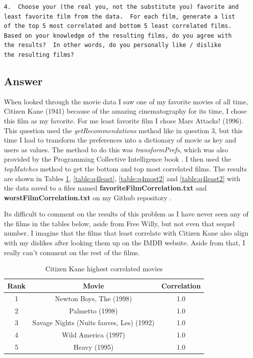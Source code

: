 \documentclass[letterpaper,11pt]{article}
\begin{document}
\begin{verbatim}
4.  Choose your (the real you, not the substitute you) favorite and
least favorite film from the data.  For each film, generate a list
of the top 5 most correlated and bottom 5 least correlated films.
Based on your knowledge of the resulting films, do you agree with
the results?  In other words, do you personally like / dislike
the resulting films?
\end{verbatim}

\subsection*{Answer}

When looked through the movie data I saw one of my favorite movies of all time, Citizen Kane (1941) because of the amazing cinematography for its time, I chose this film as my favorite. For me least favorite film I chose Mars Attacks! (1996). This question used the \textit{getRecommendations} method like in question 3, but this time I had to transform the preferences into a dictionary of movie as key and users as values. The method to do this was \textit{transformPrefs}, which was also provided by the Programming Collective Intelligence book \cite{collectiveIntell}. I then used the \textit{topMatches} method to get the bottom and top most correlated films. The results are shown in Tables \ref{table:q4most}, \ref{table:q4least}, \ref{table:q4most2} and \ref{table:q4least2} with the data saved to a files named \textbf{favoriteFilmCorrelation.txt} and \textbf{worstFilmCorrelation.txt} on my Github repository \cite{github}.

Its difficult to comment on the results of this problem as I have never seen any of the films in the tables below, aside from Free Willy, but not even that sequel number. I imagine that the films that least correlate with Citizen Kane also align with my dislikes after looking them up on the IMDB website. Aside from that, I really can't comment on the rest of the films.

\begin{table}[htb]
\centering
\begin{tabular}{ | c | c | c |}
\hline
\textbf{Rank} & \textbf{Movie} & \textbf{Correlation} \\
\hline
1 & Newton Boys, The (1998) & 1.0 \\
\hline
2 & Palmetto (1998) & 1.0 \\
\hline
3 & Savage Nights (Nuits fauves, Les) (1992) & 1.0 \\ 
\hline
4 & Wild America (1997) & 1.0 \\
\hline
5 & Heavy (1995) & 1.0 \\
\hline
\end{tabular}
\caption{Citizen Kane highest correlated movies}
\label{table:q4most}
\end{table}
\end{document}
